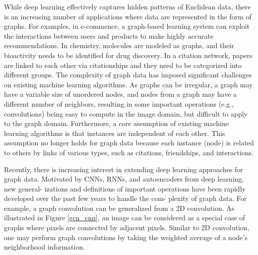 While deep learning effectively captures hidden patterns of Euclidean data, there is an increasing number of applications where data are 
represented in the form of graphs. 
For examples, in e-commence, a graph-based learning system can exploit the interactions between users and products to make highly accurate recommendations. In chemistry, molecules are modeled as graphs, and their bioactivity needs to be identified for drug discovery. In a citation network, papers are linked to each other via citationships and they need to be categorized into different groups. The complexity of graph data has imposed significant challenges on existing machine learning algorithms. 
As graphs can be irregular, a  graph  may  have  a  variable size of unordered nodes, and nodes from a graph may have a different number of neighbors, resulting in some important operations (e.g., convolutions) being  easy to  compute in the image domain, but difficult to apply to the graph domain.  Furthermore, a core assumption of existing machine learning algorithms is that instances are independent of each other. This assumption no longer holds for graph data because each instance (node) is related to others by links of various types, such as  citations, friendships, and interactions.

Recently, there is increasing interest in extending deep learning approaches for graph data. Motivated by CNNs, RNNs, and autoencoders from deep learning, new general- izations and definitions of important operations have been rapidly developed over the past few years to handle the com- plexity of graph data. For example, a graph convolution can be generalized from a 2D convolution. As illustrated in Figure \ref{gcn_cnn}, an image can be considered as a special case of graphs where pixels are connected by adjacent pixels. Similar to 2D convolution, one may perform graph convolutions by  taking  the  weighted  average  of  a  node's  neighborhood
information.


